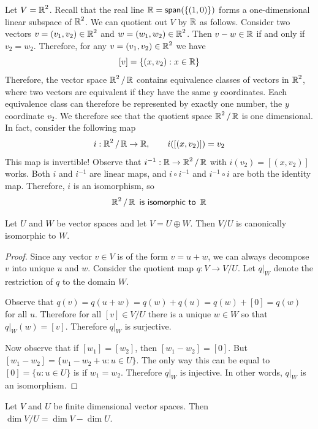 \begin{example}
    Let $V = \operatorname{\mathbb{R}}^2$. Recall that the real line $\operatorname{\mathbb{R}} = \textsf{span}(\{(1,0)\})$ forms a one-dimensional linear subspace of $\operatorname{\mathbb{R}}^2$.
    We can quotient out $V$ by $\operatorname{\mathbb{R}}$ as follows. Consider two vectors $v = (v_1,v_2) \in \operatorname{\mathbb{R}}^2$ and $w = (w_1,w_2) \in \operatorname{\mathbb{R}}^2$. Then $v-w \in \operatorname{\mathbb{R}}$ if and only if $v_2=w_2$. Therefore, for any $v=(v_1,v_2) \in \operatorname{\mathbb{R}}^2$ we have
    \[[v] = \{(x,v_2) : x \in \operatorname{\mathbb{R}}\}\]
    Therefore, the vector space $\operatorname{\mathbb{R}}^2/\operatorname{\mathbb{R}}$ contains equivalence classes of vectors in $\operatorname{\mathbb{R}}^2$, where two vectors are equivalent if they have the same $y$ coordinates. Each equivalence class can therefore be represented by exactly one number, the $y$ coordinate $v_2$. We therefore see that the quotient space $\operatorname{\mathbb{R}}^2/\operatorname{\mathbb{R}}$ is one dimensional. In fact, consider the following map
    \[i : \operatorname{\mathbb{R}}^2/\operatorname{\mathbb{R}} \to \operatorname{\mathbb{R}},\qquad i([(x,v_2)]) = v_2\]
    This map is invertible! Observe that $i^{-1} : \operatorname{\mathbb{R}} \to \operatorname{\mathbb{R}}^2/\operatorname{\mathbb{R}}$ with $i(v_2) = [(x,v_2)]$ works. Both $i$ and $i^{-1}$ are linear maps, and $i \circ i^{-1}$ and $i^{-1}\circ i$ are both the identity map. Therefore, $i$ is an isomorphism, so
    \[\operatorname{\mathbb{R}}^2/\operatorname{\mathbb{R}} \textsf{ is isomorphic to } \operatorname{\mathbb{R}}\]
\end{example}

\begin{thm}
    Let $U$ and $W$ be vector spaces and let $V = U \oplus W$. Then $V/U$ is canonically isomorphic to $W$.
\end{thm}
\begin{proof}
Since any vector $v \in V$ is of the form $v = u+w$, we can always decompose $v$ into unique $u$ and $w$. Consider the quotient map $q : V \to V/U$. Let $q|_W$ denote the restriction of $q$ to the domain $W$.


Observe that $q(v) = q(u+w) = q(w)+q(u) = q(w) + [0]= q(w)$ for all $u$. Therefore for all $[v] \in V/U$ there is a unique $w\in W$ so that $q|_W(w)=[v]$. Therefore $q|_W$ is surjective.

Now observe that if $[w_1] = [w_2]$, then $[w_1-w_2] = [0]$. But $[w_1-w_2] = \{w_1-w_2+u : u \in U\}$. The only way this can be equal to $[0]=\{u : u \in U\}$ is if $w_1=w_2$. Therefore $q|_W$ is injective. In other words, $q|_W$ is an isomorphism.
\end{proof}

\begin{cor}
Let $V$ and $U$ be finite dimensional vector spaces. Then $\dim V/U = \dim V - \dim U$.   
\end{cor}

